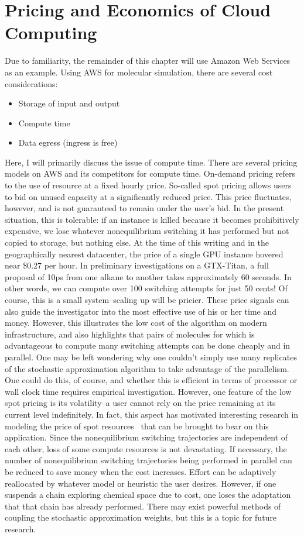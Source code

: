 \section{Pricing and Economics of Cloud Computing}
%
Due to familiarity, the remainder of this chapter will use Amazon Web Services as an example.
%
Using AWS for molecular simulation, there are several cost considerations:
\begin{itemize}
    \item Storage of input and output
    \item Compute time
    \item Data egress (ingress is free)
\end{itemize}
%
Here, I will primarily discuss the issue of compute time.
%
There are several pricing models on AWS and its competitors for compute time.
%
On-demand pricing refers to the use of resource at a fixed hourly price.
%
So-called spot pricing allows users to bid on unused capacity at a significantly reduced price.
%
This price fluctuates, however, and is not guaranteed to remain under the user's bid.
%
In the present situation, this is tolerable: if an instance is killed because it becomes prohibitively expensive, we lose whatever nonequilibrium switching it has performed but not copied to storage, but nothing else.
%
At the time of this writing and in the geographically nearest datacenter, the price of a single GPU instance hovered near \$0.27 per hour.
%
In preliminary investigations on a GTX-Titan, a full proposal of 10ps from one alkane to another takes approximately 60 seconds.
%
In other words, we can compute over 100 switching attempts for just 50 cents!
%
Of course, this is a small system--scaling up will be pricier. 
%
These price signals can also guide the investigator into the most effective use of his or her time and money.
%
However, this illustrates the low cost of the algorithm on modern infrastructure, and also highlights that pairs of molecules for which is advantageous to compute many switching attempts can be done cheaply and in parallel.
%
One may be left wondering why one couldn't simply use many replicates of the stochastic approximation algorithm to take advantage of the parallelism.
%
One could do this, of course, and whether this is efficient in terms of processor or wall clock time requires empirical investigation.
%
However, one feature of the low spot pricing is its volatility--a user cannot rely on the price remaining at its current level indefinitely.
%
In fact, this aspect has motivated interesting research in modeling the price of spot resources~\cite{Javadi2011} that can be brought to bear on this application.
%
Since the nonequilibrium switching trajectories are independent of each other, loss of some compute resources is not devastating.
%
If necessary, the number of nonequilibrium switching trajectories being performed in parallel can be reduced to save money when the cost increases.
%
Effort can be adaptively reallocated by whatever model or heuristic the user desires.
%
However, if one suspends a chain exploring chemical space due to cost, one loses the adaptation that that chain has already performed.
%
There may exist powerful methods of coupling the stochastic approximation weights, but this is a topic for future research.
%
